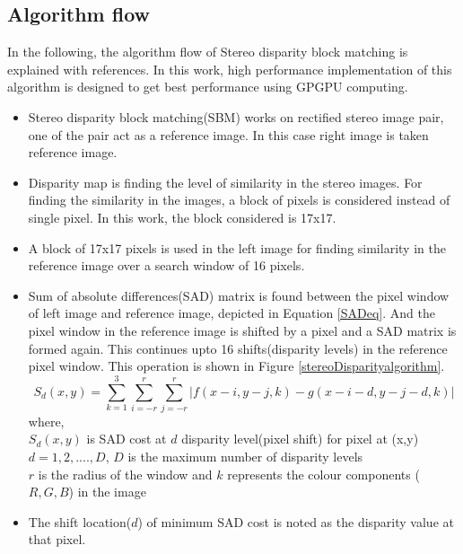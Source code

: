 \subsection{Algorithm flow}
In the following, the algorithm flow of Stereo disparity block matching is explained with references. In this work, high performance implementation of this algorithm is designed to get best performance using GPGPU computing.
\begin{itemize}
	\item Stereo disparity block matching(SBM) works on rectified stereo image pair, one of the pair act as a reference image. In this case right image is taken reference image.
	\item Disparity map is finding the level of similarity in the stereo images. For finding the similarity in the images, a block of pixels is considered instead of single pixel. In this work, the block considered is 17x17.
	\item A block of 17x17 pixels is used in the left image for finding similarity in the reference image over a search window of 16 pixels.
	\item Sum of absolute differences(SAD) matrix is found between the pixel window of left image and reference image, depicted in Equation \ref{SADeq}. And the pixel window in the reference image is shifted by a pixel and a SAD matrix is formed again. This continues upto 16 shifts(disparity levels) in the reference pixel window. This operation is shown in Figure \ref{stereoDisparityalgorithm}.
	\begin{equation}\label{SADeq}
	S_d(x,y) = \sum_{k=1}^{3}\sum_{i=-r}^{r} \sum_{j=-r}^{r} |f(x-i,y-j,k)-g(x-i-d,y-j-d,k)|
	\end{equation}
	where,\\
	$S_d(x,y)$ is SAD cost at $d$ disparity level(pixel shift) for pixel at (x,y)\\
	$d={1,2,....,D}$, $D$ is the maximum number of disparity levels \\
	$r$ is the radius of the window
	and $k$ represents the colour components ($R,G,B$) in the image
	
	\item The shift location($d$) of minimum SAD cost is noted as the disparity value at that pixel.
\end{itemize}
